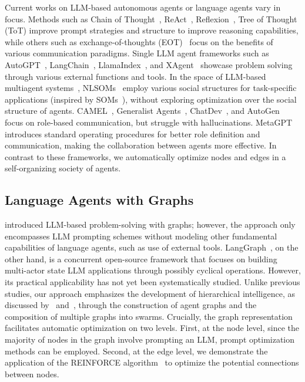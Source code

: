 \documentclass{article}
\theoremstyle{plain}
\theoremstyle{definition}
\theoremstyle{remark}
\begin{document}
Current works on LLM-based autonomous agents or language agents vary in focus. 
Methods such as Chain of Thought~\citep{wei2022chain}, ReAct~\citep{yao2022react}, Reflexion~\citep{shinn2023reflexion}, Tree of Thought (ToT) improve prompt strategies and structure to improve reasoning capabilities, while others such as exchange-of-thoughts (EOT)~\cite{yin2023exchange} focus on the benefits of various communication paradigms.
Single LLM agent frameworks such as AutoGPT~\citep{gravitas2023auto}, LangChain~\citep{Chase_LangChain_2022}, LlamaIndex~\citep{Liu_LlamaIndex_2022}, and XAgent~\citep{xagent2023} showcase problem solving through various external functions and tools. 
In the space of LLM-based multiagent systems~\citep{xie2023openagents,chen2023autoagents,chen2023agentverse}, NLSOMs~\citep{zhuge2023mindstorms} employ various social structures for task-specific applications (inspired by SOMs~\citep{minsky1988society}), without exploring optimization over the social structure of agents.
CAMEL~\citep{li2023camel}, Generalist Agents~\citep{park2023generative}, ChatDev~\citep{qian2023communicative}, and AutoGen~\citep{wu2023autogen} focus on role-based communication, but struggle with hallucinations.
MetaGPT~\citep{hong2023metagpt} introduces standard operating procedures for better role definition and communication, making the collaboration between agents more effective.
In contrast to these frameworks, we automatically optimize nodes and edges in a self-organizing society of agents. 

\subsection{Language Agents with Graphs}

\citet{besta2023graph} introduced LLM-based problem-solving with graphs; however, the approach only encompasses LLM prompting schemes without modeling other fundamental capabilities of language agents, such as use of external tools.
LangGraph~\citep{langgraph}, on the other hand, is a concurrent open-source framework that focuses on building multi-actor state LLM applications through possibly cyclical operations.
However, its practical applicability has not yet been systematically studied.
Unlike previous studies, our approach emphasizes the development of hierarchical intelligence, as discussed by~\citet{minsky1988society} and~\citet{kennedy2006swarm}, through the construction of agent graphs and the composition of multiple graphs into swarms.
Crucially, the graph representation facilitates automatic optimization on two levels.
First, at the node level, since the majority of nodes in the graph involve prompting an LLM, prompt optimization methods can be employed.
Second, at the edge level, we demonstrate the application of the REINFORCE algorithm~\citep{williams1992simple} to optimize the potential connections between nodes.
\end{document}
